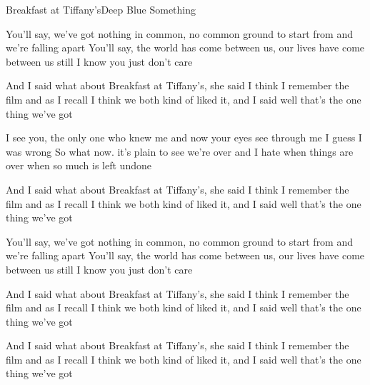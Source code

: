 \begin{song}{Breakfast at Tiffany's}{Deep Blue Something}{}

You'll say, we've got nothing in common, no common ground to start from
and we're falling apart
You'll say, the world has come between us, our lives have come between us
still I know you just don't care

And I said what about Breakfast at Tiffany's, she said I think I remember
the film and as I recall I think we both kind of liked it, and I said well that's
the one thing we've got

I see you, the only one who knew me and now your eyes see through me
I guess I was wrong
So what now. it's plain to see we're over and I hate when things are over
when so much is left undone

And I said what about Breakfast at Tiffany's, she said I think I remember
the film and as I recall I think we both kind of liked it, and I said well that's
the one thing we've got

You'll say, we've got nothing in common, no common ground to start from
and we're falling apart
You'll say, the world has come between us, our lives have come between us
still I know you just don't care

And I said what about Breakfast at Tiffany's, she said I think I remember
the film and as I recall I think we both kind of liked it, and I said well that's
the one thing we've got



And I said what about Breakfast at Tiffany's, she said I think I remember
the film and as I recall I think we both kind of liked it, and I said well that's
the one thing we've got

\end{song}
